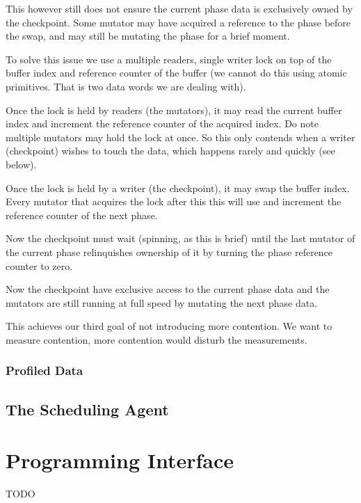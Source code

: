 This however still does not ensure the current phase data is exclusively owned by the checkpoint. Some mutator may have acquired a reference to the phase before the swap, and may still be mutating the phase for a brief moment.

To solve this issue we use a multiple readers, single writer lock on top of the buffer index and reference counter of the buffer (we cannot do this using atomic primitives. That is two data words we are dealing with).

Once the lock is held by readers (the mutators), it may read the current buffer index and increment the reference counter of the acquired index. Do note multiple mutators may hold the lock at once. So this only contends when a writer (checkpoint) wishes to touch the data, which happens rarely and quickly (see below).

Once the lock is held by a writer (the checkpoint), it may swap the buffer index. Every mutator that acquires the lock after this this will use and increment the reference counter of the next phase.

Now the checkpoint must wait (spinning, as this is brief) until the last mutator of the current phase relinquishes ownership of it by turning the phase reference counter to zero.

Now the checkpoint have exclusive access to the current phase data and the mutators are still running at full speed by mutating the next phase data.

This achieves our third goal of not introducing more contention. We want to measure contention, more contention would disturb the measurements.

\subsubsection{Profiled Data} \label{sec:agentprof}


\subsection{The Scheduling Agent}


\section{Programming Interface} \label{sec:api}

TODO

